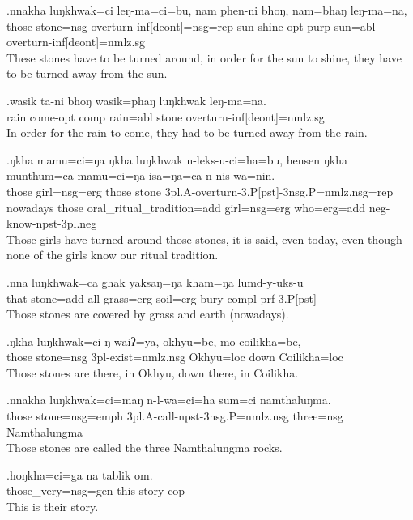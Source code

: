 \exg.nnakha luŋkhwak=ci  leŋ-ma=ci=bu, nam phen-ni bhoŋ, nam=bhaŋ leŋ-ma=na,\\
those  stone{\sc =nsg} overturn{\sc -inf[deont]=nsg=rep} sun shine{\sc -opt} purp sun{\sc =abl} overturn{\sc -inf[deont]=nmlz.sg}\\
These stones have to be turned around, in order for the sun to shine, they have to be turned away from the sun.

\exg.wasik ta-ni  bhoŋ wasik=phaŋ luŋkhwak leŋ-ma=na.\\
rain  come{\sc -opt} comp  rain{\sc =abl} stone overturn{\sc -inf[deont]=nmlz.sg}\\
In order for the rain to come, they had to be turned away from the rain.

\exg.ŋkha mamu=ci=ŋa  ŋkha luŋkhwak n-leks-u-ci=ha=bu, hensen ŋkha munthum=ca  mamu=ci=ŋa  isa=ŋa=ca  n-nis-wa=nin.\\
those girl{\sc =nsg=erg} those stone {\sc 3pl.A-}overturn{\sc -3.P[pst]-3nsg.P=nmlz.nsg=rep} nowadays those oral\_ritual\_tradition{\sc =add} {\sc girl=nsg=erg} who{\sc =erg=add} {\sc neg-}know{\sc -npst-3pl.neg}\\
Those girls have turned around those stones, it is said, even today, even though none of the girls know our ritual tradition.

\exg.nna  luŋkhwak=ca  ghak yaksaŋ=ŋa kham=ŋa lumd-y-uks-u\\
that stone{\sc =add} all  grass{\sc =erg} soil{\sc =erg} bury{\sc -compl-prf-3.P[pst]}\\
Those stones are covered by grass and earth (nowadays).

\exg.ŋkha luŋkhwak=ci  ŋ-waiʔ=ya,   okhyu=be, mo coilikha=be,\\
those stone{\sc =nsg} {\sc 3pl-}exist{\sc =nmlz.nsg} Okhyu{\sc =loc} down Coilikha{\sc =loc}\\
Those stones are there, in Okhyu, down there, in Coilikha.

\exg.nnakha luŋkhwak=ci=maŋ  n-l-wa=ci=ha    sum=ci namthaluŋma.\\
those  stone{\sc =nsg=emph} {\sc 3pl.A-}call{\sc -npst-3nsg.P=nmlz.nsg} three{\sc =nsg} Namthalungma\\
Those stones are called the three Namthalungma rocks.

\exg.hoŋkha=ci=ga  na tablik om.\\
those\_very{\sc =nsg=gen} this story  {\sc cop}\\
This is their story.


